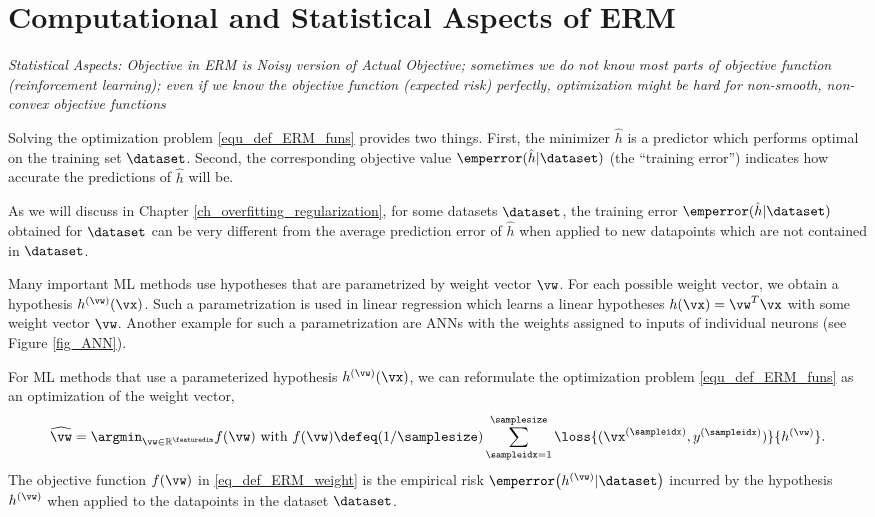 \documentclass[12pt]{report}
\begin{document}
\section{Computational and Statistical Aspects of ERM}
\label{sec_comp_stat_ERM}

\emph{Statistical Aspects: Objective in ERM is Noisy version of Actual Objective; sometimes we do 
not know most parts of objective function (reinforcement learning); even if we know 
the objective function (expected risk) perfectly, optimization might be hard for non-smooth, 
non-convex objective functions}

Solving the optimization problem \eqref{equ_def_ERM_funs} provides 
two things. First, the minimizer $\hat{h}$ is a predictor which performs 
optimal on the training set $\dataset$. Second, the corresponding 
objective value $\emperror(\hat{h}|\dataset)$ (the ``training error'') 
indicates how accurate the predictions of $\hat{h}$ will be. 

As we will discuss in Chapter \ref{ch_overfitting_regularization}, for some 
datasets $\dataset$, the training error $\emperror(\hat{h}|\dataset)$ obtained 
for $\dataset$ can be very different from the average prediction error of $\hat{h}$ 
when applied to new datapoints which are not contained in $\dataset$. 

Many important ML methods use hypotheses that are parametrized by 
weight vector $\vw$. For each possible weight vector, we obtain a 
hypothesis $h^{(\vw)}(\vx)$. Such a parametrization is used in linear 
regression which learns a linear hypotheses $h(\vx) = \vw^{T} \vx$ with 
some weight vector $\vw$. Another example for such a parametrization 
are ANNs with the weights assigned to inputs of individual neurons (see Figure \ref{fig_ANN}). 

For ML methods that use a parameterized hypothesis $h^{(\vw)}(\vx)$, 
we can reformulate the optimization problem \eqref{equ_def_ERM_funs} 
as an optimization of the weight vector, 
\begin{equation}
\label{eq_def_ERM_weight}
    \widehat{\vw} = \argmin_{\vw \in \mathbb{R}^{\featuredim}} f(\vw) \mbox{ with } f(\vw) \defeq(1/\samplesize) \sum_{\sampleidx=1}^{\samplesize} \loss{(\vx^{(\sampleidx)},y^{(\sampleidx)})}{h^{(\vw)}}. 
\end{equation}
The objective function $f(\vw)$ in \eqref{eq_def_ERM_weight} is 
the empirical risk $\emperror\big(h^{(\vw)} |\dataset\big)$ incurred  
by the hypothesis $h^{(\vw)}$ when applied to the datapoints in the dataset $\dataset$. 
\end{document}
